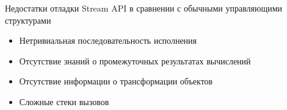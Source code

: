 \begin{frame}
\frametitle{\insertsection} 
\framesubtitle{\insertsubsection}
Недостатки отладки Stream API в сравнении с обычными управляющими структурами
\begin{itemize}
	\item Нетривиальная последовательность исполнения
	\item Отсутствие знаний о промежуточных результатах вычислений 
	\item Отсутствие информации о трансформации объектов
	\item Сложные стеки вызовов
\end{itemize}
\end{frame}
